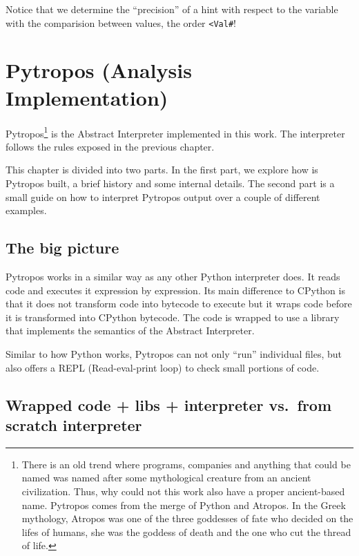 \documentclass[
11pt, %
english, %
singlespacing, %
headsepline, %
]{MastersDoctoralThesis} %
\begin{document}
Notice that we determine the \enquote{precision} of a hint with respect
to the variable with the comparision between values, the order
\texttt{\textless{}Val\#}!

\hypertarget{pytropos-analysis-implementation}{%
\chapter{Pytropos (Analysis
Implementation)}\label{pytropos-analysis-implementation}}

Pytropos\footnote{There is an old trend where programs, companies and
  anything that could be named was named after some mythological
  creature from an ancient civilization. Thus, why could not this work
  also have a proper ancient-based name. Pytropos comes from the merge
  of Python and Atropos. In the Greek mythology, Atropos was one of the
  three goddesses of fate who decided on the lifes of humans, she was
  the goddess of death and the one who cut the thread of life.} is the
Abstract Interpreter implemented in this work. The interpreter follows
the rules exposed in the previous chapter.

This chapter is divided into two parts. In the first part, we explore
how is Pytropos built, a brief history and some internal details. The
second part is a small guide on how to interpret Pytropos output over a
couple of different examples.

\hypertarget{the-big-picture}{%
\section{The big picture}\label{the-big-picture}}

{}

Pytropos works in a similar way as any other Python interpreter does. It
reads code and executes it expression by expression. Its main difference
to CPython is that it does not transform code into bytecode to execute
but it wraps code before it is transformed into CPython bytecode. The
code is wrapped to use a library that implements the semantics of the
Abstract Interpreter.

Similar to how Python works, Pytropos can not only \enquote{run}
individual files, but also offers a REPL (Read-eval-print loop) to check
small portions of code.

\hypertarget{wrapped-code-libs-interpreter-vs.from-scratch-interpreter}{%
\section{Wrapped code + libs + interpreter vs.~from scratch
interpreter}\label{wrapped-code-libs-interpreter-vs.from-scratch-interpreter}}
\end{document}

